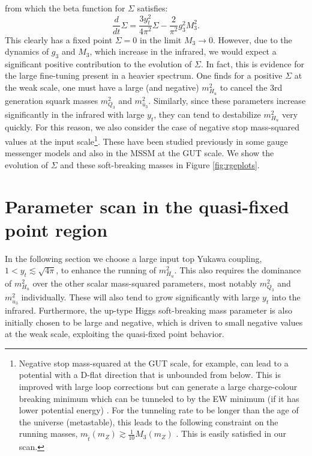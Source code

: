 from which the beta function for $\Sigma$ satisfies:
\begin{equation}
\frac{d}{dt}\Sigma=\frac{3 y^2_t}{4\pi^2} \Sigma - \frac{2}{\pi^2}g_3^2 M^2_3.
\end{equation}
This clearly has a fixed point $\Sigma=0$ in the limit $M_3 \rightarrow 0$. However, due to the dynamics of $g_3$ and $M_3$, which increase in the infrared, we would expect a significant positive contribution to the evolution of $\Sigma$. In fact, this is evidence for the large fine-tuning present in a heavier spectrum. One finds for a positive $\Sigma$ at the weak scale, one must have a large (and negative) $m^2_{H_u}$ to cancel the 3rd generation squark masses $m^2_{Q_3}$ and $m^2_{\bar{u}_3}$. Similarly, since these parameters increase significantly in the infrared with large $y_t$, they can tend to destabilize $m^2_{H_u}$ very quickly. For this reason, we also consider the case of negative stop mass-squared values at the input scale\footnote{Negative stop mass-squared at the GUT scale, for example, can lead to a potential with a D-flat direction that is unbounded from below. This is improved with large loop corrections but can generate a large charge-colour breaking minimum which can be tunneled to by the EW minimum (if it has lower potential energy) \cite{RN778}. For the tunneling rate to be longer than the age of the universe (metastable), this leads to the following constraint on the running masses, $m_{\tilde{t}}(m_Z) \gtrsim \frac{1}{10}M_3 (m_Z)$ \cite{RN769}. This is easily satisfied in our scan.}. These have been studied previously in some gauge messenger models \cite{RN776} and also in the MSSM \cite{RN769,RN777} at the GUT scale. We show the evolution of $\Sigma$ and these soft-breaking masses in Figure \ref{fig:rgeplots}.

\section{Parameter scan in the quasi-fixed point region}
\label{sec:QFPscan}

In the following section we choose a large input top Yukawa coupling, $1 < y_t \lesssim \sqrt{4\pi}$, to enhance the running of $m^2_{H_u}$. This also requires the dominance of $m^2_{H_u}$ over the other scalar mass-squared parameters, most notably $m^2_{Q_3}$ and $m^2_{\bar{u}_3}$ individually. These will also tend to grow significantly with large $y_t$ into the infrared. Furthermore, the up-type Higgs soft-breaking mass parameter is also initially chosen to be large and negative, which is driven to small negative values at the weak scale, exploiting the quasi-fixed point behavior.

